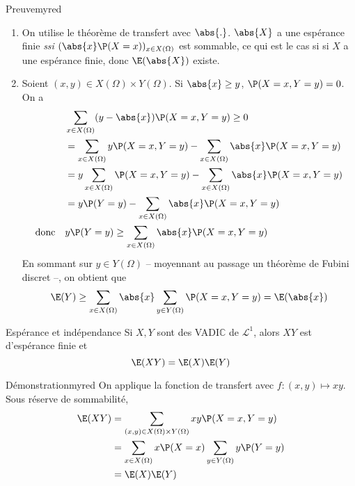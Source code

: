     \begin{demo}{Preuve}{myred}
        \begin{enumerate}
            \item On utilise le théorème de transfert avec $\abs{.}$. $\abs{X}$ a une espérance finie \textit{ssi} $(\abs{x}\P(X=x))_{x \in X(\Omega)}$ est sommable, ce qui est le cas si si $X$ a une espérance finie, donc $\E(\abs{X})$ existe.
            \item Soient $(x,y) \in X(\Omega) \times Y(\Omega)$. Si $\abs{x} \geq y$, $\P(X=x,Y=y) = 0$. On a 
            \begin{align*}
                &\sum_{x \in X(\Omega)} (y - \abs{x}) \P(X= x, Y =y) \geq 0 \\
                &= \sum_{x \in X(\Omega)} y \P(X = x,Y=y) - \sum_{x \in X(\Omega)} \abs{x} \P(X = x, Y = y) \\
                &= y \sum_{x \in X(\Omega)} \P(X = x, Y = y) - \sum_{x \in X(\Omega)} \abs{x} \P(X = x, Y = y) \\
                &= y \P(Y = y) - \sum_{x \in X(\Omega)} \abs{x} \P(X = x, Y = y) \\
                \text{donc} \quad &y \P(Y = y) \geq \sum_{x \in X(\Omega)} \abs{x} \P(X=x,Y=y) 
            \end{align*}
            En sommant sur $y \in Y(\Omega)$ -- moyennant au passage un théorème de Fubini discret --, on obtient que 
            \begin{align*}
                \E(Y) \geq \sum_{x \in X(\Omega)} \abs{x} \sum_{y \in Y(\Omega)} \P(X=x, Y=y) = \E(\abs{x}) 
            \end{align*}
        \end{enumerate}
    \end{demo}

    \begin{theo}{Espérance et indépendance}{}
        Si $X,Y$ sont des VADI$\mathbb{C}$ de $\mathcal{L}^1$, alors $XY$ est d’espérance finie et 
        \[ \E(XY) = \E(X)\E(Y) \]   
    \end{theo}

    \begin{demo}{Démonstration}{myred}
        On applique la fonction de transfert avec $f : (x,y) \mapsto xy$. Sous réserve de sommabilité, 
        \begin{align*}
            \E(XY) &= \sum_{(x,y) \in X(\Omega) \times Y(\Omega)} xy \P(X = x, Y = y) \\ 
            &= \sum_{x \in X(\Omega)} x \P(X = x) \sum_{y \in Y(\Omega)} y \P(Y = y) \\
            &= \E(X) \E(Y)
        \end{align*}
    \end{demo}

